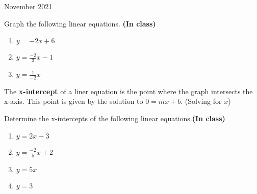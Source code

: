 \documentclass[12pt,oneside]{book} %
\begin{document}
\begin{lec}{November 2021}
	\begin{ex}
		Graph the following linear equations. \textbf{(In class)}
		\begin{enumerate}
			\item $y = -2x + 6$
			\item $y = \frac{-2}{3}x - 1$
			\item $y = \frac{1}{-2}x$
		\end{enumerate}
	\end{ex}

	\begin{mdframed}
		\begin{defn}
			The \textbf{x-intercept} of a liner equation is the point where the graph intersects the x-axis. This point is given by the
			 solution to $0 = mx + b$. (Solving for $x $)
		\end{defn}
	\end{mdframed}

	\begin{ex}
		Determine the x-intercepts of the following linear equations.\textbf{(In class)}
		\begin{enumerate}
			\item $y = 2x - 3$
			\item $y = \frac{-2}{5}x + 2$
			\item $y = 5x$
			\item $y = 3$
		\end{enumerate}
	\end{ex}

	\end{lec}
\end{document}
